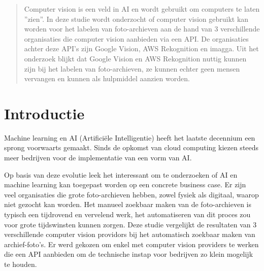 \documentclass[a0,portrait]{a0poster}
\begin{document}
\begin{multicols}{2} %


\color{HoGentAccent1} %

\begin{abstract}
Computer vision is een veld in AI en wordt gebruikt om computers te laten ''zien''. In deze studie wordt onderzocht of computer vision gebruikt kan worden voor het labelen van foto-archieven aan de hand van 3 verschillende organisaties die computer vision aanbieden via een API. De organisaties achter deze API's zijn Google Vision, AWS Rekognition en imagga. Uit het onderzoek blijkt dat Google Vision en AWS Rekognition nuttig kunnen zijn bij het labelen van foto-archieven, ze kunnen echter geen mensen vervangen en kunnen als hulpmiddel aanzien worden.
\end{abstract}

\color{HoGentAccent1} 
\section*{Introductie}
\color{black}
\color{black}
Machine learning en AI (Artificiële Intelligentie) heeft het laatste decennium een sprong voorwaarts gemaakt. Sinds de opkomst van cloud computing kiezen steeds meer bedrijven voor de implementatie van een vorm van AI.

Op basis van deze evolutie leek het interessant om te onderzoeken of AI en machine learning kan toegepast worden op een concrete business case. Er zijn veel organisaties die grote foto-archieven hebben, zowel fysiek als digitaal, waarop niet gezocht kan worden. Het manueel zoekbaar maken van de foto-archieven is typisch een tijdrovend en vervelend werk, het automatiseren van dit proces zou voor grote tijdswinsten kunnen zorgen. Deze studie vergelijkt de resultaten van 3 verschillende computer vision providors bij het automatisch zoekbaar maken van archief-foto's. Er werd gekozen om enkel met computer vision providers te werken die een API aanbieden om de technische instap voor bedrijven zo klein mogelijk te houden.


\end{multicols}
\end{document}
